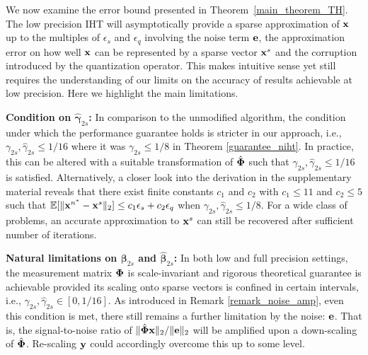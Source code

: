 \documentclass{article}
\begin{document}
We now examine the error bound presented in Theorem~\ref{main_theorem_TH}. The low precision IHT will asymptotically provide a sparse approximation of ${\bf x}$ up to the multiples of $ {\epsilon}_s$ and $ {\epsilon}_q$ involving the noise term ${\bf e}$, the approximation error on how well ${\bf x}$ can be represented by a sparse vector ${\bf x}^s$ and the corruption introduced by the quantization operator. This makes intuitive sense yet still requires the understanding of our limits on the accuracy of results achievable at low precision. Here we highlight the main limitations.

{\bf Condition on $\hat{\boldsymbol{\gamma}}_{2s}$:} In comparison to the unmodified algorithm, the condition under which the performance guarantee holds is stricter in our approach, i.e., ${\gamma}_{2s}, \hat{\gamma}_{2s}\leq 1/16$ where it was ${\gamma}_{2s}\leq 1/8$ in Theorem \ref{guarantee_niht}. In practice, this can be altered with a suitable transformation of $\hat{\bf \Phi}$ such that ${\gamma}_{2s}, \hat{\gamma}_{2s}\leq 1/16$ is satisfied. Alternatively, a closer look into the derivation in the supplementary material reveals that there exist finite constants $c_1$ and $c_2$ with $c_1\leq 11$ and $c_2\leq 5$ such that $\mathbb{E}[\|{\bf x}^{n^*}-{\bf x}^s \|_2] \leq c_1\epsilon_s + c_2\epsilon_q$ when ${\gamma}_{2s}, \hat{\gamma}_{2s}\leq 1/8$. For a wide class of problems, an accurate approximation to ${\bf x}^s$ can still be recovered after sufficient number of iterations.


{\bf Natural limitations on ${\boldsymbol{\beta}}_{2s}$ and $\hat{\boldsymbol{\beta}}_{2s}$:} In both low and full precision settings, the measurement matrix ${\bf \Phi}$ is scale-invariant and rigorous theoretical guarantee is achievable provided its scaling onto sparse vectors is confined in certain intervals, i.e., ${\gamma}_{2s}, \hat{\gamma}_{2s}\in [0, 1/16]$. As introduced in Remark \ref{remark_noise_amp}, even this condition is met, there still remains a further limitation by the noise: ${\bf e}$. That is, the signal-to-noise ratio of $\|\hat{\bf \Phi} {\bf x} \|_2/\|{\bf e} \|_2$ will be amplified upon a down-scaling of $\hat{\bf \Phi}$. Re-scaling ${\bf y}$ could accordingly overcome this up to some level. 
\end{document}
